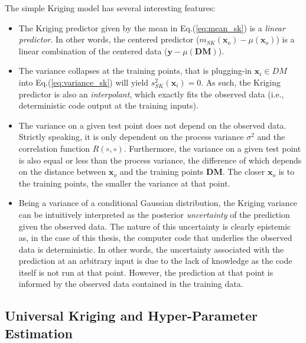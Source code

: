The simple Kriging model has several interesting features:
\begin{itemize}
	\item The Kriging predictor given by the mean in Eq.(\ref{eq:mean_sk}) is a \emph{linear predictor}. 
	      In other words, the centered predictor ($m_{SK}(\mathbf{x}_o) - \mu (\mathbf{x}_o)$)  is a linear combination of the centered data 
	      ($\mathbf{y} - \mu(\mathbf{DM})$).
	\item The variance collapses at the training points, that is plugging-in $\mathbf{x}_i \in DM$ into Eq.(\ref{eq:variance_sk}) will yield $s^2_{SK}(\mathbf{x}_i) = 0$.
	      As such, the Kriging predictor is also an \emph{interpolant}, which exactly fits the observed data (i.e., deterministic code output at the training inputs).
	\item The variance on a given test point does not depend on the observed data.
	      Strictly speaking, it is only dependent on the process variance $\sigma^2$ and the correlation function $R(\circ,\circ)$.
				Furthermore, the variance on a given test point is also equal or less than the process variance, 
				the difference of which depends on the distance between $\mathbf{x}_o$ and the training points $\mathbf{DM}$.
				The closer $\mathbf{x}_o$ is to the training points, the smaller the variance at that point.
	\item Being a variance of a conditional Gaussian distribution, the Kriging variance can be intuitively interpreted as the posterior \emph{uncertainty} of the prediction given the observed data.
	      The nature of this uncertainty is clearly epistemic as, in the case of this thesis, the computer code that underlies the observed data is deterministic.
				In other words, the uncertainty associated with the prediction at an arbitrary input is due to the lack of knowledge as the code itself is not run at that point.
				However, the prediction at that point is informed by the observed data contained in the training data.
\end{itemize}



\subsection{Universal Kriging and Hyper-Parameter Estimation}\label{sub:gp_uk}

